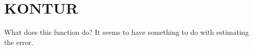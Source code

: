 \section{KONTUR}
\label{sect:kontur}

\noindent What does this function do? It seems to have something to do with
estimating the error.\\

